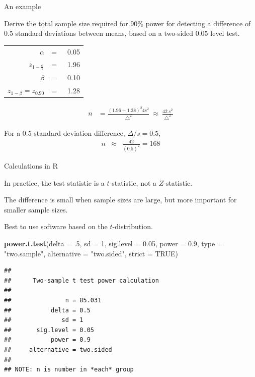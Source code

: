 \documentclass[ignorenonframetext,]{beamer}
\newenvironment{Shaded}{\begin{snugshade}}{\end{snugshade}}
\newcommand{\DataTypeTok}[1]{\textcolor[rgb]{0.13,0.29,0.53}{#1}}
\newcommand{\DecValTok}[1]{\textcolor[rgb]{0.00,0.00,0.81}{#1}}
\newcommand{\FloatTok}[1]{\textcolor[rgb]{0.00,0.00,0.81}{#1}}
\newcommand{\KeywordTok}[1]{\textcolor[rgb]{0.13,0.29,0.53}{\textbf{#1}}}
\newcommand{\NormalTok}[1]{#1}
\newcommand{\OtherTok}[1]{\textcolor[rgb]{0.56,0.35,0.01}{#1}}
\newcommand{\StringTok}[1]{\textcolor[rgb]{0.31,0.60,0.02}{#1}}
\begin{document}
\begin{frame}{%
\protect\hypertarget{an-example-1}{%
An example}}

Derive the total sample size required for 90\% power for detecting a
difference of 0.5 standard deviations between means, based on a
two-sided 0.05 level test.

\begin{center}
\begin{tabular}{rcl}
$\alpha$                   & = & ~0.05 \\[1ex]
$z_{1-\frac{\alpha}{2}}$   & = & ~1.96 \\[1ex]
$\beta$                    & = & ~0.10 \\[1ex]
$z_{1 - \beta} = z_{0.90}$ & = & ~1.28 \\[1ex]
\end{tabular}
\end{center}

\begin{align*}
n &=  \frac{\left(1.96  + 1.28 \right)^2
4 s^2}{\triangle^2} ~ \approx ~ \frac{42 ~s^2}{\triangle^2}
\end{align*}

For a 0.5 standard deviation difference, \(\Delta/s=0.5\),
\begin{eqnarray*}
n & \approx & \frac{42}{(0.5)^2} = 168
\end{eqnarray*}

\end{frame}

\begin{frame}[fragile]{%
\protect\hypertarget{calculations-in-r}{%
Calculations in R}}

In practice, the test statistic is a \(t\)-statistic, not a
\(Z\)-statistic.

The difference is small when sample sizes are large, but more important
for smaller sample sizes.

Best to use software based on the \(t\)-distribution. \footnotesize

\begin{Shaded}
\begin{Highlighting}[]
\KeywordTok{power.t.test}\NormalTok{(}\DataTypeTok{delta =} \FloatTok{.5}\NormalTok{, }\DataTypeTok{sd =} \DecValTok{1}\NormalTok{, }\DataTypeTok{sig.level =} \FloatTok{0.05}\NormalTok{,}
             \DataTypeTok{power =} \FloatTok{0.9}\NormalTok{, }\DataTypeTok{type =} \StringTok{"two.sample"}\NormalTok{,}
             \DataTypeTok{alternative =} \StringTok{"two.sided"}\NormalTok{, }\DataTypeTok{strict =} \OtherTok{TRUE}\NormalTok{)}
\end{Highlighting}
\end{Shaded}

\begin{verbatim}
## 
##      Two-sample t test power calculation 
## 
##               n = 85.031
##           delta = 0.5
##              sd = 1
##       sig.level = 0.05
##           power = 0.9
##     alternative = two.sided
## 
## NOTE: n is number in *each* group
\end{verbatim}

\end{frame}
\end{document}
